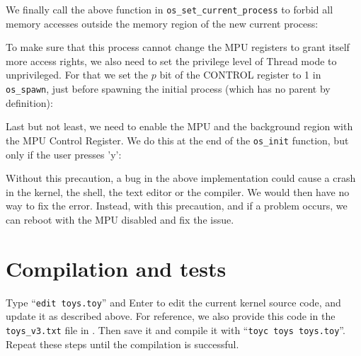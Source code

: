 We finally call the above function in {\tt os\_set\_current\_process} to forbid
all memory accesses outside the memory region of the new current process:



To make sure that this process cannot change the MPU registers to grant itself
more access rights, we also need to set the privilege level of Thread mode to
unprivileged. For that we set the $p$ bit of the CONTROL register to 1 in {\tt
os\_spawn}, just before spawning the initial process (which has no parent by
definition):



Last but not least, we need to enable the MPU and the background region with
the MPU Control Register. We do this at the end of the {\tt os\_init} function,
but only if the user presses 'y':


Without this precaution, a bug in the above implementation could cause a crash
in the kernel, the shell, the text editor or the compiler. We would then have
no way to fix the error. Instead, with this precaution, and if a problem
occurs, we can reboot with the MPU disabled and fix the issue.


\section{Compilation and tests}

Type ``{\tt edit toys.toy}'' and Enter to edit the current kernel source code,
and update it as described above. For reference, we also provide this code in
the {\tt toys\_v3.txt} file in . Then save it and compile
it with ``{\tt toyc toys toys.toy}''. Repeat these steps until the compilation
is successful.

